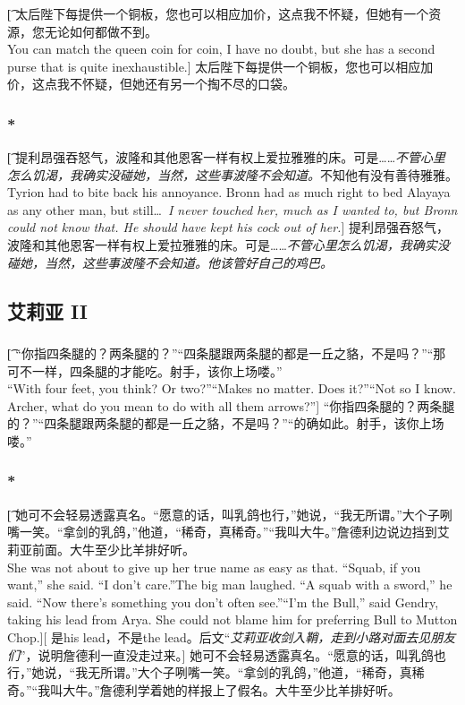 \documentclass[12pt,a4paper]{article}
\begin{document}
\subsubsection{}\t[
	太后陛下每提供一个铜板，您也可以相应加价，这点我不怀疑，但她有一个资源，您无论如何都做不到。\\
	You can match the queen coin for coin, I have no doubt, but she has a second purse that is quite inexhaustible.]
	太后陛下每提供一个铜板，您也可以相应加价，这点我不怀疑，但她还有另一个掏不尽的口袋。
	
\subsubsection{\color{red}*}\t[	
	提利昂强吞怒气，波隆和其他恩客一样有权上爱拉雅雅的床。可是……\emph{不管心里怎么饥渴，我确实没碰她，当然，这些事波隆不会知道。}不知他有没有善待雅雅。\\
	Tyrion had to bite back his annoyance. Bronn had as much right to bed Alayaya as any other man, but still\ldots \emph{I never touched her, much as I wanted to, but Bronn could not know that. He should have kept his cock out of her.}]
	提利昂强吞怒气，波隆和其他恩客一样有权上爱拉雅雅的床。可是……\emph{不管心里怎么饥渴，我确实没碰她，当然，这些事波隆不会知道。他该管好自己的鸡巴。}
	
\subsection{艾莉亚 II}
\subsubsection{}\t[
	“你指四条腿的？两条腿的？”“四条腿跟两条腿的都是一丘之貉，不是吗？”“那可不一样，四条腿的才能吃。射手，该你上场喽。”\\
	“With four feet, you think? Or two?”“Makes no matter. Does it?”“Not so I know. Archer, what do you mean to do with all them arrows?”]
	“你指四条腿的？两条腿的？”“四条腿跟两条腿的都是一丘之貉，不是吗？”“的确如此。射手，该你上场喽。”
	
\subsubsection{\color{red}*}\t[
	她可不会轻易透露真名。“愿意的话，叫乳鸽也行，”她说，“我无所谓。”大个子咧嘴一笑。“拿剑的乳鸽，”他道，“稀奇，真稀奇。”“我叫大牛。”詹德利边说边挡到艾莉亚前面。大牛至少比羊排好听。\\
	She was not about to give up her true name as easy as that. “Squab, if you want,” she said. “I don't care.”The big man laughed. “A squab with a sword,” he said. “Now there's something you don't often see.”“I'm the Bull,” said Gendry, taking his lead from Arya. She could not blame him for preferring Bull to Mutton Chop.][
	是his lead，不是the lead。后文“\emph{艾莉亚收剑入鞘，走到小路对面去见朋友们}”，说明詹德利一直没走过来。]
	她可不会轻易透露真名。“愿意的话，叫乳鸽也行，”她说，“我无所谓。”大个子咧嘴一笑。“拿剑的乳鸽，”他道，“稀奇，真稀奇。”“我叫大牛。”詹德利学着她的样报上了假名。大牛至少比羊排好听。
	
\end{document}
